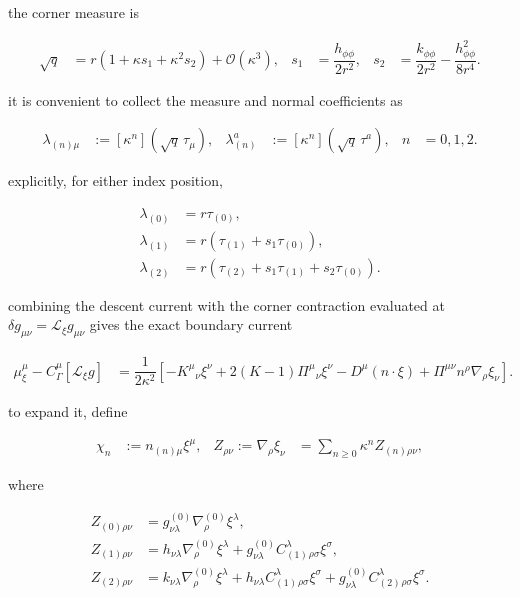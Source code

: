 the corner measure is

\begin{align}
\sqrt{q} & =r\left(1+\kappa s_{1}+\kappa ^2s_{2}\right)+\mathcal{O}(\kappa ^3), & s_{1}&=\dfrac{h_{\phi \phi}}{2r^{2}}, & s_{2}&=\dfrac{k_{\phi \phi}}{2r^{2}}-\dfrac{h_{\phi \phi}^{2}}{8r^{4}}.
\end{align}

it is convenient to collect the measure and normal coefficients as

\begin{align}
\lambda _{(n)\mu} & :=[\kappa ^n]\left(\sqrt{q}\,\tau _{\mu}\right), & \lambda _{(n)}^{a}&:=[\kappa ^n]\left(\sqrt{q}\,\tau ^a\right), & n&=0,1,2.
\end{align}

explicitly, for either index position,

\[\begin{aligned}
\lambda _{(0)} & =r\tau _{(0)}, \\
\lambda _{(1)} & =r\left(\tau _{(1)}+s_{1}\tau _{(0)}\right), \\
\lambda _{(2)} & =r\left(\tau _{(2)}+s_{1}\tau _{(1)}+s_{2}\tau _{(0)}\right).
\end{aligned}\]

combining the descent current with the corner contraction evaluated at $\displaystyle{\delta g_{\mu \nu}=\mathcal{L}_{\xi}g_{\mu \nu}}$ gives the exact boundary current

\begin{align}
\mu _{\xi}^{\mu}-C_{\Gamma}^{\mu}[\mathcal{L}_{\xi}g] & =\dfrac{1}{2\kappa ^2}\left[-K^{\mu}{}_{\nu}\xi ^{\nu}+2(K-1)\Pi ^{\mu}{}_{\nu}\xi ^{\nu}-D^{\mu}(n\mathbin{\cdot}\xi)+\Pi ^{\mu \nu}n^{\rho}\nabla _{\rho}\xi _{\nu}\right].
\end{align}

to expand it, define

\begin{align}
\chi _{n} & :=n_{(n)\mu}\xi ^{\mu}, & Z_{\rho \nu}:=\nabla _{\rho}\xi _{\nu}&=\sum _{n\geq0}\kappa ^nZ_{(n)\rho \nu},
\end{align}

where

\[\begin{aligned}
Z_{(0)\rho \nu} & =g_{\nu \lambda}^{(0)}\nabla ^{(0)}_{\rho}\xi ^{\lambda}, \\
Z_{(1)\rho \nu} & =h_{\nu \lambda}\nabla ^{(0)}_{\rho}\xi ^{\lambda}+g_{\nu \lambda}^{(0)}C_{(1)}^{\lambda}{}_{\rho \sigma}\xi ^{\sigma}, \\
Z_{(2)\rho \nu} & =k_{\nu \lambda}\nabla ^{(0)}_{\rho}\xi ^{\lambda}+h_{\nu \lambda}C_{(1)}^{\lambda}{}_{\rho \sigma}\xi ^{\sigma}+g_{\nu \lambda}^{(0)}C_{(2)}^{\lambda}{}_{\rho \sigma}\xi ^{\sigma}.
\end{aligned}\]

